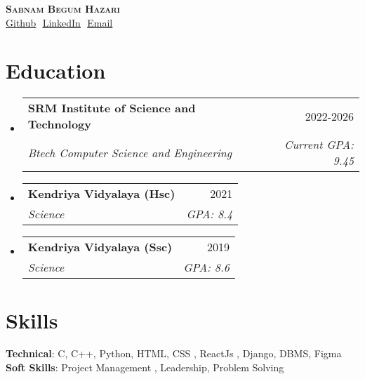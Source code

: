 \documentclass[letterpaper,11pt]{article}
\makeatletter
\newcommand{\resumeSubheading}[4]{
  \vspace{-2pt}\item
    \begin{tabular*}{0.97\textwidth}[t]{l@{\extracolsep{\fill}}r}
      \textbf{#1} & #2 \\
      \textit{\small#3} & \textit{\small #4} \\
    \end{tabular*}\vspace{-7pt}
}
\newcommand{\resumeSubHeadingListStart}{\begin{itemize}[leftmargin=0.15in, label={}]}
\newcommand{\resumeSubHeadingListEnd}{\end{itemize}}
\makeatother
\begin{document}
\begin{flushright}
  \color{gray}
  \item
\end{flushright}

\vspace{-5pt}

\begin{center}
    \textbf{\Huge \scshape Sabnam Begum Hazari} \\ \vspace{8pt}
    \small 
    \href{https://github.com/sha9506}{\underline{Github}} $  $
    \href{www.linkedin.com/in/sabnam-begum-hazari-398605233}{\underline{LinkedIn}} $  $
    \href{mailto:sabnamhazari@gmail.com}
    {\underline{Email}}
\end{center}

\section{Education}
  \resumeSubHeadingListStart
  
    \resumeSubheading
      {SRM Institute of Science and Technology}{2022-2026}
      {Btech Computer Science and Engineering}{Current GPA: 9.45}
      
    \resumeSubheading
      {Kendriya Vidyalaya \footnotesize{(Hsc)}}{2021}
      {Science}{GPA: 8.4}
      \resumeSubheading
      {Kendriya Vidyalaya \footnotesize{(Ssc)}}{2019}
      {Science}{GPA: 8.6}
      
  \resumeSubHeadingListEnd

\section{Skills}
 \begin{itemize}[leftmargin=0.15in, label={}]
    \small{\item{
    
     \textbf{Technical}{: C, C++, Python,  HTML, CSS , ReactJs , Django, DBMS, Figma } \\
     \textbf{Soft Skills}{: Project Management , Leadership, Problem Solving}
     
     
     
    }}
 \end{itemize}
\end{document}
